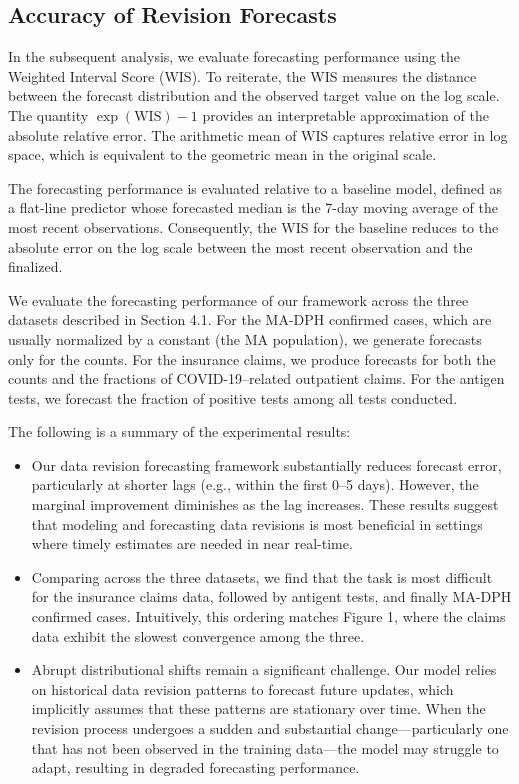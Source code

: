 \subsection{Accuracy of Revision Forecasts}
In the subsequent analysis, we evaluate forecasting performance using the Weighted Interval Score (WIS). To reiterate, the WIS measures the distance between the forecast distribution and the observed target value on the log scale. The quantity \( \exp(\text{WIS}) - 1 \) provides an interpretable approximation of the absolute relative error. The arithmetic mean of WIS captures relative error in log space, which is equivalent to the geometric mean in the original scale. 

The forecasting performance is evaluated relative to a baseline model, defined as a flat-line predictor whose forecasted median is the 7-day moving average of the most recent observations. Consequently, the WIS for the baseline reduces to the absolute error on the log scale between the most recent observation and the finalized.

We evaluate the forecasting performance of our framework across the three datasets described in Section 4.1. For the MA-DPH confirmed cases, which are usually normalized by a constant (the MA population), we generate forecasts only for the counts. For the insurance claims, we produce forecasts for both the counts and the fractions of COVID-19–related outpatient claims. For the antigen tests, we forecast the fraction of positive tests among all tests conducted.


The following is a summary of the experimental results:
\begin{itemize}
    \item Our data revision forecasting framework substantially reduces forecast error, particularly at shorter lags (e.g., within the first 0–5 days). However, the marginal improvement diminishes as the lag increases. These results suggest that modeling and forecasting data revisions is most beneficial in settings where timely estimates are needed in near real-time.
    \item Comparing across the three datasets, we find that the task is most difficult for the insurance claims data, followed by antigent tests, and finally MA-DPH confirmed cases. Intuitively, this ordering matches Figure 1, where the claims data exhibit the slowest convergence among the three.
    \item Abrupt distributional shifts remain a significant challenge. Our model relies on historical data revision patterns to forecast future updates, which implicitly assumes that these patterns are stationary over time. When the revision process undergoes a sudden and substantial change—particularly one that has not been observed in the training data—the model may struggle to adapt, resulting in degraded forecasting performance. 

\end{itemize}

